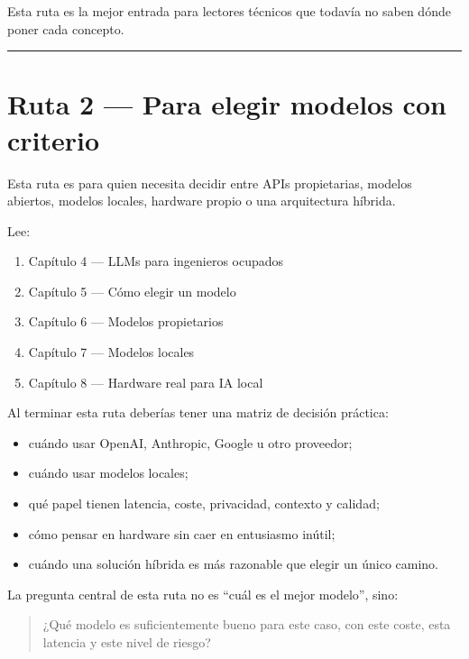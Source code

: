 Esta ruta es la mejor entrada para lectores técnicos que todavía no
saben dónde poner cada concepto.

\begin{center}\rule{0.5\linewidth}{0.5pt}\end{center}

\section{Ruta 2 --- Para elegir modelos con
criterio}\label{ruta-2-para-elegir-modelos-con-criterio}

Esta ruta es para quien necesita decidir entre APIs propietarias,
modelos abiertos, modelos locales, hardware propio o una arquitectura
híbrida.

Lee:

\begin{enumerate}
\def\labelenumi{\arabic{enumi}.}
\tightlist
\item
  Capítulo 4 --- LLMs para ingenieros ocupados
\item
  Capítulo 5 --- Cómo elegir un modelo
\item
  Capítulo 6 --- Modelos propietarios
\item
  Capítulo 7 --- Modelos locales
\item
  Capítulo 8 --- Hardware real para IA local
\end{enumerate}

Al terminar esta ruta deberías tener una matriz de decisión práctica:

\begin{itemize}
\tightlist
\item
  cuándo usar OpenAI, Anthropic, Google u otro proveedor;
\item
  cuándo usar modelos locales;
\item
  qué papel tienen latencia, coste, privacidad, contexto y calidad;
\item
  cómo pensar en hardware sin caer en entusiasmo inútil;
\item
  cuándo una solución híbrida es más razonable que elegir un único
  camino.
\end{itemize}

La pregunta central de esta ruta no es ``cuál es el mejor modelo'',
sino:

\begin{quote}
¿Qué modelo es suficientemente bueno para este caso, con este coste,
esta latencia y este nivel de riesgo?
\end{quote}

